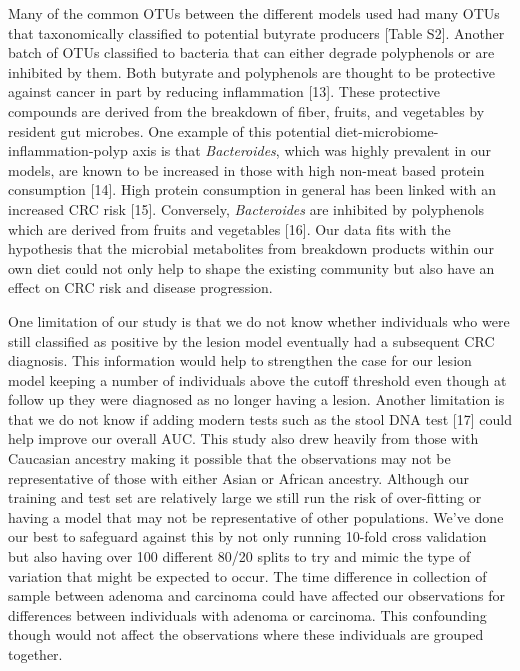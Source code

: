 \documentclass[12pt,]{article}
\begin{document}
Many of the common OTUs between the different models used had many OTUs
that taxonomically classified to potential butyrate producers {[}Table
S2{]}. Another batch of OTUs classified to bacteria that can either
degrade polyphenols or are inhibited by them. Both butyrate and
polyphenols are thought to be protective against cancer in part by
reducing inflammation {[}13{]}. These protective compounds are derived
from the breakdown of fiber, fruits, and vegetables by resident gut
microbes. One example of this potential
diet-microbiome-inflammation-polyp axis is that \emph{Bacteroides},
which was highly prevalent in our models, are known to be increased in
those with high non-meat based protein consumption {[}14{]}. High
protein consumption in general has been linked with an increased CRC
risk {[}15{]}. Conversely, \emph{Bacteroides} are inhibited by
polyphenols which are derived from fruits and vegetables {[}16{]}. Our
data fits with the hypothesis that the microbial metabolites from
breakdown products within our own diet could not only help to shape the
existing community but also have an effect on CRC risk and disease
progression.

One limitation of our study is that we do not know whether individuals
who were still classified as positive by the lesion model eventually had
a subsequent CRC diagnosis. This information would help to strengthen
the case for our lesion model keeping a number of individuals above the
cutoff threshold even though at follow up they were diagnosed as no
longer having a lesion. Another limitation is that we do not know if
adding modern tests such as the stool DNA test {[}17{]} could help
improve our overall AUC. This study also drew heavily from those with
Caucasian ancestry making it possible that the observations may not be
representative of those with either Asian or African ancestry. Although
our training and test set are relatively large we still run the risk of
over-fitting or having a model that may not be representative of other
populations. We've done our best to safeguard against this by not only
running 10-fold cross validation but also having over 100 different
80/20 splits to try and mimic the type of variation that might be
expected to occur. The time difference in collection of sample between
adenoma and carcinoma could have affected our observations for
differences between individuals with adenoma or carcinoma. This
confounding though would not affect the observations where these
individuals are grouped together.
\end{document}
